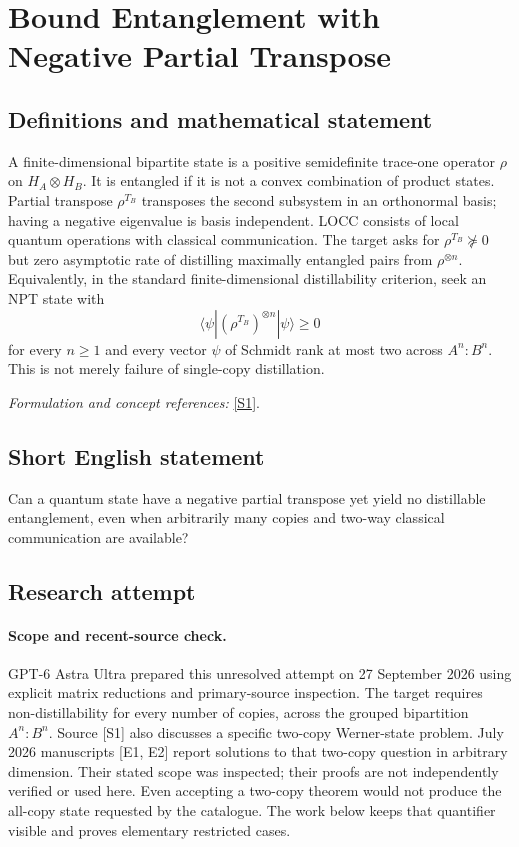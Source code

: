 \documentclass[11pt]{article}
\begin{document}
\section*{\texorpdfstring{Bound Entanglement with Negative Partial Transpose}{Bound Entanglement with Negative Partial Transpose}}\label{8200004}
\subsection{Definitions and mathematical statement}
A finite-dimensional bipartite state is a positive semidefinite trace-one operator $\rho$ on $H_A\otimes H_B$. It is entangled if it is not a convex combination of product states. Partial transpose $\rho^{T_B}$ transposes the second subsystem in an orthonormal basis; having a negative eigenvalue is basis independent. LOCC consists of local quantum operations with classical communication. The target asks for $\rho^{T_B}\not\succeq0$ but zero asymptotic rate of distilling maximally entangled pairs from $\rho^{\otimes n}$. Equivalently, in the standard finite-dimensional distillability criterion, seek an NPT state with
\[
 \langle\psi|(\rho^{T_B})^{\otimes n}|\psi\rangle\ge0
\]
for every $n\ge1$ and every vector $\psi$ of Schmidt rank at most two across $A^n:B^n$. This is not merely failure of single-copy distillation.
\par\smallskip\textit{Formulation and concept references:} \href{https://arxiv.org/pdf/2002.03233}{[S1]}.

\subsection{Short English statement}
Can a quantum state have a negative partial transpose yet yield no distillable entanglement, even when arbitrarily many copies and two-way classical communication are available?
\subsection{Research attempt}
\paragraph{Scope and recent-source check.}
GPT-6 Astra Ultra prepared this unresolved attempt on 27 September 2026
using explicit matrix reductions and primary-source inspection. The
target requires non-distillability for every number of copies, across
the grouped bipartition $A^n:B^n$. Source [S1] also discusses a
specific two-copy Werner-state problem. July 2026 manuscripts [E1, E2]
report solutions to that two-copy question in arbitrary dimension.
Their stated scope was inspected; their proofs are not independently
verified or used here. Even accepting a two-copy theorem would not
produce the all-copy state requested by the catalogue. The work below
keeps that quantifier visible and proves elementary restricted cases.
\end{document}
